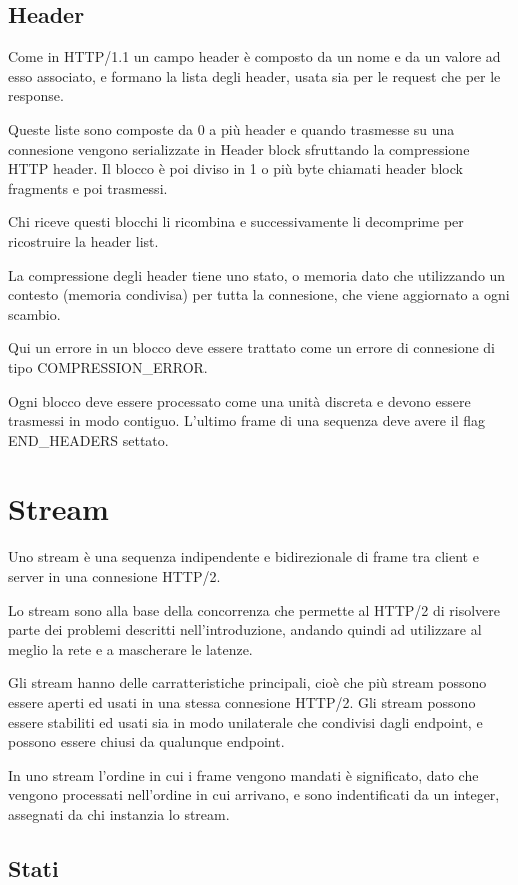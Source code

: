 \documentclass[12pt, a4paper]{article} %
\begin{document}
\subsection{Header}
Come in HTTP/1.1 un campo header è composto da un nome e da un valore ad esso associato, e formano la lista degli header, usata sia per le request che per le response.

Queste liste sono composte da 0 a più header e quando trasmesse su una connesione vengono serializzate in Header block sfruttando la compressione HTTP header. Il blocco è poi diviso
in 1 o più byte chiamati header block fragments e poi trasmessi.

Chi riceve questi blocchi li ricombina e successivamente li decomprime per ricostruire la header list.

La compressione degli header tiene uno stato, o memoria dato che utilizzando un contesto (memoria condivisa) per tutta la connesione, che viene aggiornato a ogni scambio.

Qui un errore in un blocco deve essere trattato come un errore di connesione di tipo COMPRESSION\_ERROR.

Ogni blocco deve essere processato come una unità discreta e devono essere trasmessi in modo contiguo.
L'ultimo frame di una sequenza deve avere il flag END\_HEADERS settato.

\section{Stream}
Uno stream è una sequenza indipendente e bidirezionale di frame tra client e server in una connesione HTTP/2.

Lo stream sono alla base della concorrenza che permette al HTTP/2 di risolvere parte dei problemi descritti nell'introduzione, andando quindi ad utilizzare al meglio la rete e a mascherare le latenze.

Gli stream hanno delle carratteristiche principali, cioè che più stream possono essere aperti ed usati in una stessa connesione HTTP/2.
Gli stream possono essere stabiliti ed usati sia in modo unilaterale che condivisi dagli endpoint, e possono essere chiusi da qualunque endpoint.

In uno stream l'ordine in cui i frame vengono mandati è significato, dato che vengono processati nell'ordine in cui arrivano, e sono indentificati da un integer, assegnati da chi instanzia lo stream.

\subsection{Stati}
\end{document}

